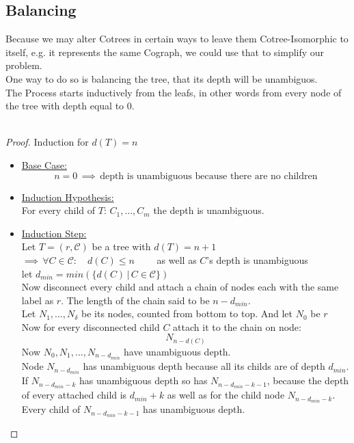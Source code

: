 \documentclass[a4paper,12pt]{article}
\theoremstyle{definition}
\begin{document}
	\subsection{Balancing}
	Because we may alter Cotrees in certain ways to leave them Cotree-Isomorphic to itself, e.g. it represents the same Cograph, we could use that to simplify our problem.\\
	One way to do so is balancing the tree, that its depth will be unambiguos.
	\\The Process starts inductively from the leafs, in other words from every node of the tree with depth equal to $0$.\\\\
	\begin{proof}
		Induction for $d(T)=n$
		\begin{itemize}
			\item \underline{Base Case:}
			\[n=0 \,\implies \, \text{depth is unambiguous because there are no children}\]
			\item \underline{Induction Hypothesis:}\\
			For every child of $T$: $C_1,...,C_m$ the depth is unambiguous.
			\item \underline{Induction Step:}\\
			Let $T=(r,\mathcal{C})$ be a tree with $d(T) = n + 1$\\
			$\implies \,\forall C \in \mathcal{C}:\quad d(C)\leq n\qquad $ as well as $C$'s depth is unambiguous\\
			let $d_{min} = min\left(\{d(C)\, \vert \, C\in\mathcal{C}\}\right)$\\
			Now disconnect every child and attach a chain of nodes each with the same label as $r$. The length of the chain said to be $n - d_{min}$.\\
			Let $N_1,...,N_\delta$ be its nodes, counted from bottom to top. And let $N_0$ be $r$\\
			Now for every disconnected child $C$ attach it to the chain on node:
			\[N_{n - d(C)}\]
			Now $N_0,N_1,...,N_{n-d_{min}}$ have unambiguous depth.\\
			Node $N_{n-d_{min}}$ has unambiguous depth because all its childs are of depth $d_{min}$.\\
			If $N_{n-d_{min} - k }$ has unambiguous depth so has $N_{n- d_{min} - k - 1}$, because the depth of every attached child is $d_{min} + k$ as well as for the child node $N_{n-d_{min} - k}$. Every child of $N_{n- d_{min} - k - 1}$ has unambiguous depth. \\
		\end{itemize}
	\end{proof}
\end{document}
